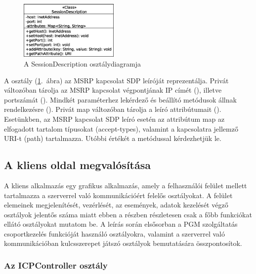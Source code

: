 \begin{figure}
  \vspace{-15pt}
  \begin{center}
    \includegraphics[width=0.43\textwidth]{img/class_diagrams/SessionDescription.eps}
  \end{center}
  \vspace{-15pt}
  \captionsetup{font=scriptsize}
  \caption{A SessionDescription osztálydiagramja}
   \label{fig:class_sdp}
  \vspace{-10pt}
\end{figure}

A  osztály (\ref{fig:class_sdp}.~ábra) az MSRP kapcsolat SDP leíróját reprezentálja. Privát változóban tárolja az MSRP kapcsolat végpontjának IP címét (), illetve portszámát (). Mindkét paraméterhez lekérdező és beállító metódusok állnak rendelkezésre (). Privát map változóban tárolja a leíró attribútumait (). Esetünkben, az MSRP kapcsolat SDP leíró esetén az attribútum map az elfogadott tartalom típusokat (accept-types), valamint a kapcsolatra jellemző URI-t (path) tartalmazza. Utóbbi értékét a  metódussal kérdezhetjük le.

\subsection{A kliens oldal megvalósítása}

A kliens alkalmazás egy grafikus alkalmazás, amely a felhasználói felület mellett tartalmazza a szerverrel való kommunikációért felelős osztályokat. A felület elemeinek megjelenítését, vezérlését, az események, adatok kezelését végző osztályok jelentős száma miatt ebben a részben részletesen csak a főbb funkciókat ellátó osztályokat mutatom be. A leírás során elsősorban a PGM szolgáltatás csoportkezelés funkcióját használó osztályokra, valamint a szerverrel való kommunikációban kulcsszerepet játszó osztályok bemutatására összpontosítok.

\newpage
\subsubsection*{Az ICPController osztály}
\label{sec:client_icpcontroller}

